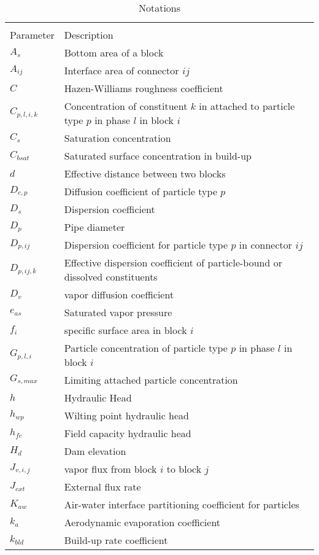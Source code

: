 \begin{longtable}{| p{} | p{} |}
\caption{Notations} %
\hline\\
Parameter & Description\\
\hline %
$A_s$ & Bottom area of a block \\
$A_{ij}$ & Interface area of connector $ij$ \\
$C$ & Hazen-Williams roughness coefficient \\
$C_{p,l,i,k}$ & Concentration of constituent $k$ in attached to particle type $p$ in phase $l$ in block $i$ \\
$C_s$ & Saturation concentration \\
$C_{bsat}$ & Saturated surface concentration in build-up \\
$d$ & Effective distance between two blocks \\
$D_{c,p}$ & Diffusion coefficient of particle type $p$\\
$D_s$ & Dispersion coefficient \\
$D_p$ & Pipe diameter \\
$D_{p,ij}$ & Dispersion coefficient for particle type $p$ in connector $ij$\\
$D_{p,ij,k}$ & Effective dispersion coefficient of particle-bound or dissolved constituents \\
$D_v$ & vapor diffusion coefficient \\
$e_{as}$ & Saturated vapor pressure \\
$f_i$ & specific surface area in block $i$ \\
$G_{p,l,i}$ & Particle concentration of particle type $p$ in phase $l$ in block $i$ \\
$G_{s,max}$ & Limiting attached particle concentration \\
$h$ & Hydraulic Head \\
$h_{wp}$ & Wilting point hydraulic head \\
$h_{fc}$ & Field capacity hydraulic head \\
$H_d$ & Dam elevation\\
$J_{v,i,j}$ & vapor flux from block $i$ to block $j$\\
$J_{ext}$ & External flux rate \\ 
$K_{aw}$ & Air-water interface partitioning coefficient for particles \\
$k_a$ & Aerodynamic evaporation coefficient \\
$k_{bld}$ & Build-up rate coefficient \\

\end{longtable}
